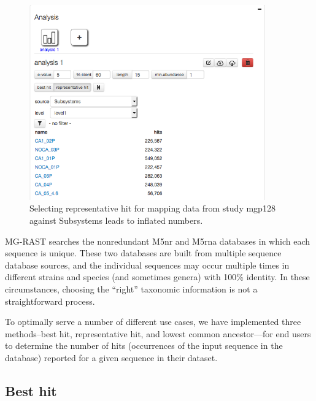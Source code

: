 \documentclass[12pt,fullpage]{report}
\begin{document}
\begin{figure}
\begin{center}
\includegraphics[width=4in]{Images/v402-UI-Analysis-representative-hit-selected.png}
\end{center}
\caption{
Selecting representative hit for mapping data from study mgp128 against Subsystems  leads to inflated numbers.
}
\label{fig:UI-analysis-best-hit}


\end{figure}
MG-RAST searches the nonredundant M5nr and M5rna databases in which each sequence is unique. These two databases are built from multiple sequence database sources, and the individual sequences may occur multiple times in different strains and species (and sometimes genera) with 100\% identity. In these circumstances, choosing the ``right'' taxonomic information is not a straightforward process.

To optimally serve a number of different use cases, we have implemented three methods--best hit, representative hit, and lowest common ancestor---for
end users to determine the number of hits
(occurrences of the input sequence in the database)
reported for a given sequence in their dataset.
\subsection*{Best hit}
\end{document}
